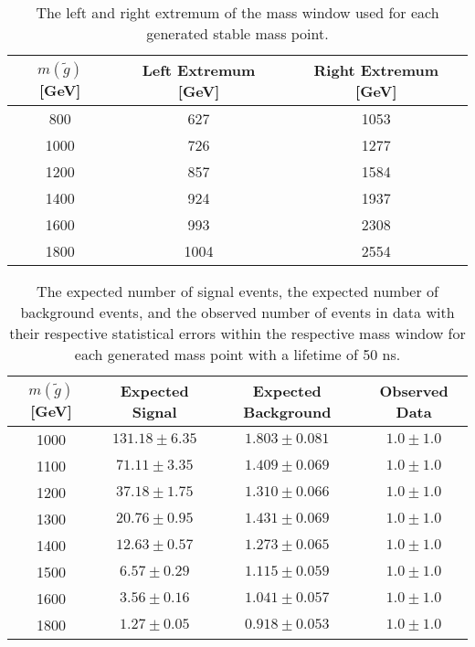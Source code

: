 \begin{table}[!htbp]
  \begin{center}
    \begin{tabular}{ccc}
        \hline
        $m(\tilde{g})$ [GeV]  & Left Extremum [GeV] & Right Extremum [GeV] \\
        \hline
        800    & 627 & 1053 \\
        1000    & 726 & 1277 \\
        1200    & 857 & 1584 \\
        1400    & 924 & 1937 \\
        1600    & 993 & 2308 \\
        1800    & 1004 & 2554 \\
        \hline
    \end{tabular}
  \end{center}
  \caption{The left and right extremum of the mass window used for each generated stable mass point.}
  \label{tab:app_window_stable}
\end{table}



\begin{table}[!htbp]
  \begin{center}
    \begin{tabular}{cccc}
      \hline
      $m(\tilde{g})$ [GeV]  & Expected Signal & Expected Background & Observed Data\\ 
      \hline
      1000    & $131.18 \pm 6.35 $ & $1.803 \pm 0.081 $ & $1.0 \pm 1.0$ \\
      1100    & $71.11 \pm 3.35 $ & $1.409 \pm 0.069 $ & $1.0 \pm 1.0$ \\
      1200    & $37.18 \pm 1.75 $ & $1.310 \pm 0.066 $ & $1.0 \pm 1.0$ \\
      1300    & $20.76 \pm 0.95 $ & $1.431 \pm 0.069 $ & $1.0 \pm 1.0$ \\
      1400    & $12.63 \pm 0.57 $ & $1.273 \pm 0.065 $ & $1.0 \pm 1.0$ \\
      1500    & $6.57 \pm 0.29 $ & $1.115 \pm 0.059 $ & $1.0 \pm 1.0$ \\
      1600    & $3.56 \pm 0.16 $ & $1.041 \pm 0.057 $ & $1.0 \pm 1.0$ \\
      1800    & $1.27 \pm 0.05 $ & $0.918 \pm 0.053 $ & $1.0 \pm 1.0$ \\
      \hline
    \end{tabular}
  \end{center}
  \caption{The expected number of signal events, the expected number of background events, and the observed number of events in data with their respective statistical errors within the respective mass window for each generated mass point with a lifetime of 50 ns.}
  \label{tab:app_counts_50ns}
\end{table}

